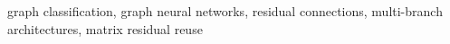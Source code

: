 \documentclass[conference]{IEEEtran}
\begin{document}
\begin{IEEEkeywords}
graph classification, graph neural networks, residual connections,
multi-branch architectures, matrix residual reuse
\end{IEEEkeywords}











\end{document}
